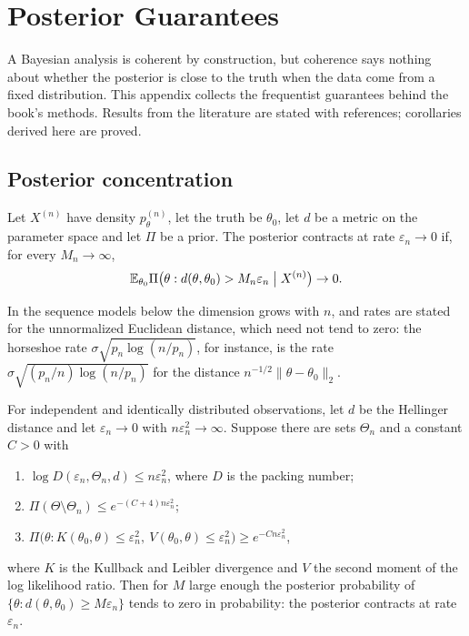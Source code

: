 \newcommand{\pgqmin}{0.82}
\newcommand{\pgqmax}{1.73}
\newcommand{\pgkmin}{0.16}
\newcommand{\pgkmax}{0.38}
\chapter{Posterior Guarantees}\label{app:guarantees}

A Bayesian analysis is coherent by construction, but coherence says nothing about whether the posterior is close to the truth when the data come from a fixed distribution. This appendix collects the frequentist guarantees behind the book's methods. Results from the literature are stated with references; corollaries derived here are proved.

\section{Posterior concentration}\label{pg:sec:contraction}

Let $X^{(n)}$ have density $p_\theta^{(n)}$, let the truth be $\theta_0$, let $d$ be a metric on the parameter space and let $\Pi$ be a prior. The posterior contracts at rate $\varepsilon_n\to0$ if, for every $M_n\to\infty$,
\[
\mathbb{E}_{\theta_0}\Pi\bigl(\theta: d(\theta,\theta_0) > M_n\varepsilon_n \bigm| X^{(n)}\bigr)\to 0 .
\]

In the sequence models below the dimension grows with $n$, and rates are stated for the unnormalized Euclidean distance, which need not tend to zero: the horseshoe rate $\sigma\sqrt{p_n\log(n/p_n)}$, for instance, is the rate $\sigma\sqrt{(p_n/n)\log(n/p_n)}$ for the distance $n^{-1/2}\lVert\theta-\theta_0\rVert_2$.

\begin{theorem}\label{pg:thm:ggv}
For independent and identically distributed observations, let $d$ be the Hellinger distance and let $\varepsilon_n\to0$ with $n\varepsilon_n^2\to\infty$. Suppose there are sets $\Theta_n$ and a constant $C>0$ with
\begin{enumerate}[label=(\roman*)]
\item $\log D(\varepsilon_n,\Theta_n,d)\le n\varepsilon_n^2$, where $D$ is the packing number;
\item $\Pi(\Theta\setminus\Theta_n)\le e^{-(C+4)n\varepsilon_n^2}$;
\item $\Pi\bigl(\theta: K(\theta_0,\theta)\le\varepsilon_n^2,\ V(\theta_0,\theta)\le\varepsilon_n^2\bigr)\ge e^{-Cn\varepsilon_n^2}$,
\end{enumerate}
where $K$ is the Kullback and Leibler divergence and $V$ the second moment of the log likelihood ratio. Then for $M$ large enough the posterior probability of $\{\theta: d(\theta,\theta_0)\ge M\varepsilon_n\}$ tends to zero in probability: the posterior contracts at rate $\varepsilon_n$.
\end{theorem}

